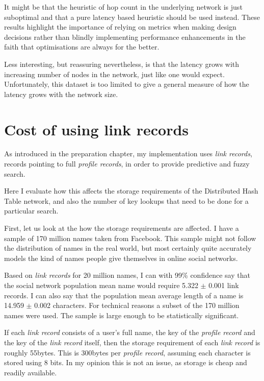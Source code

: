 It might be that the heuristic of hop count in the underlying network is just suboptimal and that a pure latency based heuristic should be used instead.
These results highlight the importance of relying on metrics when making design decisions rather than blindly implementing performance enhancements in the faith that optimisations are always for the better.

Less interesting, but reassuring nevertheless, is that the latency grows with increasing number of nodes in the network, just like one would expect. Unfortunately, this dataset is too limited to give a general measure of how the latency grows with the network size.

\section{Cost of using link records}
\label{sec:costOfLinkRecords}
As introduced in the preparation chapter, my implementation uses \emph{link records}, records pointing to full \emph{profile records}, in order to provide predictive and fuzzy search.

Here I evaluate how this affects the storage requirements of the Distributed Hash Table network, and also the number of key lookups that need to be done for a particular search.

First, let us look at the how the storage requirements are affected.
I have a sample of 170 million names taken from Facebook. This sample might not follow the distribution of names in the real world, but most certainly quite accurately models the kind of names people give themselves in online social networks.

Based on \emph{link records} for 20 million names, I can with 99\% confidence say that the social network population mean name would require 5.322 $\pm$ 0.001 link records. I can also say that the population mean average length of a name is 14.959 $\pm$ 0.002 characters. For technical reasons a subset of the 170 million names were used. The sample is large enough to be statistically significant.

If each \emph{link record} consists of a user's full name, the key of the \emph{profile record} and the key of the \emph{link record} itself, then the storage requirement of each \emph{link record} is roughly 55bytes. This is 300bytes per \emph{profile record}, assuming each character is stored using 8 bits.
In my opinion this is not an issue, as storage is cheap and readily available.

